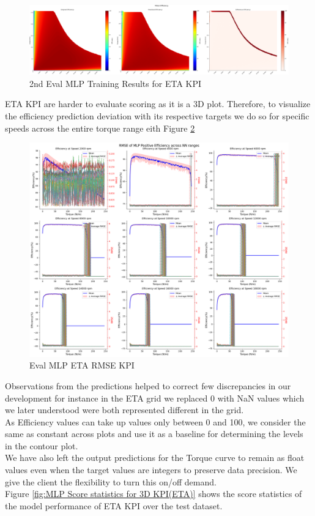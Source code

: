 \documentclass{report} %
\begin{document}
\begin{figure}[H]
    \centering
    \includegraphics[width=1\textwidth]{./ReportImages/evalKPI3Dprediction2.png} 
    \caption{2nd Eval MLP Training Results for ETA \ac{KPI}} 
    \label{fig:2nd Eval MLP Training for 3D KPI(ETA)}
\end{figure}

ETA \ac{KPI} are harder to evaluate scoring as it is a \ac{3D} plot. Therefore, to visualize the efficiency prediction deviation with its respective targets we do so for specific speeds across the entire torque range eith Figure \ref{fig:Eval MLP ETA RMSE KPI}
\begin{figure}[H]
    \centering
    \includegraphics[width=1\textwidth]{./ReportImages/rmse_eta_MLP.png} 
    \caption{Eval MLP ETA \ac{RMSE} \ac{KPI}} 
    \label{fig:Eval MLP ETA RMSE KPI}
\end{figure}

Observations from the predictions helped to correct few discrepancies in our development for instance in the ETA grid we replaced 0 with \ac{NaN} values which we later understood were both represented different in the grid.\\
As Efficiency values can take up values only between 0 and 100, we consider the same as constant across plots and use it as a baseline for determining the levels in the contour plot. \\ 
We have also left the output predictions for the Torque curve to remain as float values even when the target values are integers to preserve data precision. We give the client the flexibility to turn this on/off demand. \\
Figure \ref{fig:MLP Score statistics for 3D KPI(ETA)} shows the score statistics of the model performance of ETA \ac{KPI} over the test dataset.\\
\end{document}
